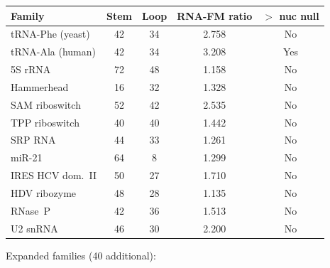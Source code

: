 \documentclass[11pt]{article}
\begin{document}
\begin{table}[h]
\centering
\small
\begin{tabular}{@{}lcccc@{}}
\toprule
\textbf{Family} & \textbf{Stem} & \textbf{Loop} &
  \textbf{RNA-FM ratio} & \textbf{$>$ nuc null} \\
\midrule
tRNA-Phe (yeast)    & 42 & 34 & 2.758 & No \\
tRNA-Ala (human)    & 42 & 34 & 3.208 & Yes \\
5S rRNA             & 72 & 48 & 1.158 & No \\
Hammerhead          & 16 & 32 & 1.328 & No \\
SAM riboswitch      & 52 & 42 & 2.535 & No \\
TPP riboswitch      & 40 & 40 & 1.442 & No \\
SRP RNA             & 44 & 33 & 1.261 & No \\
miR-21              & 64 &  8 & 1.299 & No \\
IRES HCV dom.~II    & 50 & 27 & 1.710 & No \\
HDV ribozyme        & 48 & 28 & 1.135 & No \\
RNase~P             & 42 & 36 & 1.513 & No \\
U2 snRNA            & 46 & 30 & 2.200 & No \\
\bottomrule
\end{tabular}
\end{table}

Expanded families (40 additional):
\end{document}
